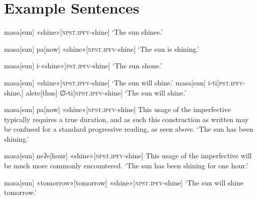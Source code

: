 \part{Example Sentences}
\ex
\begingl
masa[sun]
«shine»[\textsc{npst.ipfv}-shine]
\glft `The sun shines.'
\endgl
\xe

\ex
\begingl
masa[sun]
pa[now]
«shine»[\textsc{npst.ipfv}-shine]
\glft `The sun is shining.'
\endgl
\xe

\ex
\begingl
masa[sun]
i-«shine»[\textsc{pst.ipfv}-shine]
\glft `The sun shone.'
\endgl
\xe

\pex
\a
\begingl
masa[sun]
«shine»[\textsc{npst.ipfv}-shine]
\glft `The sun will shine.'
\endgl
\a
\begingl
masa[sun]
i-ti[\textsc{pst.ipfv-}shine,]
alete[thus]
∅-ti[\textsc{npst.ipfv-}shine]
\glft `The sun will shine.'
\endgl
\xe

\pex
\a
\beginglpanel
\glpreamble
\endpreamble
masa[sun]
pa[now]
«shine»[\textsc{npst.ipfv}-shine]
\endgl
This usage of the imperfective typically requires a true duration, and as such this construction as written may be confused for a standard progressive reading, as seen above.
\endpanel
`The sun has been shining.'

\a
\beginglpanel
\glpreamble
\endpreamble
masa[sun]
neʔe[hour]
«shine»[\textsc{npst.ipfv}-shine]
\endgl
This usage of the imperfective will be much more commonly encountered.
\endpanel
`The sun has been shining for one hour.'
\xe

\ex
\begingl
masa[sun]
«tomorrow»[tomorrow]
«shine»[\textsc{npst.ipfv}-shine]
\glft `The sun will shine tomorrow.'
\endgl
\xe



